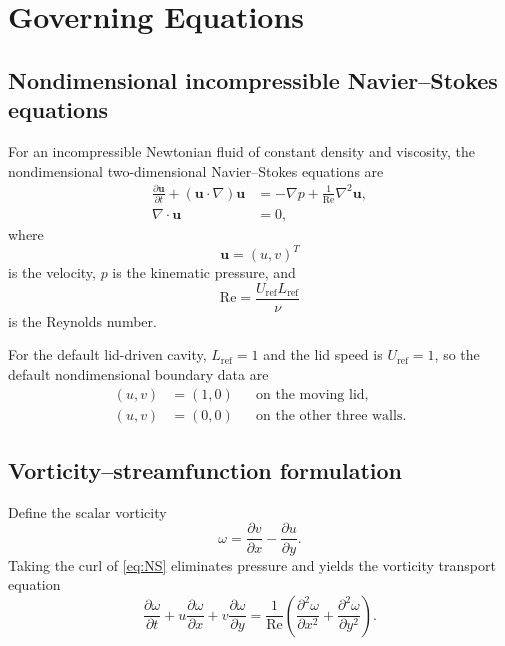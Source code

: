 \documentclass[11pt,a4paper]{article}
\newcommand{\Rey}{\mathrm{Re}}
\begin{document}
\section{Governing Equations}

\subsection{Nondimensional incompressible Navier--Stokes equations}

For an incompressible Newtonian fluid of constant density and viscosity, the nondimensional two-dimensional Navier--Stokes equations are
\begin{align}
\frac{\partial \bm{u}}{\partial t}
+ (\bm{u}\cdot\nabla)\bm{u}
&= -\nabla p + \frac{1}{\Rey}\nabla^2\bm{u},
\label{eq:NS}\\
\nabla\cdot\bm{u} &= 0,
\label{eq:continuity}
\end{align}
where
\[
\bm{u}=(u,v)^T
\]
is the velocity, $p$ is the kinematic pressure, and
\[
\Rey=\frac{U_{\mathrm{ref}}L_{\mathrm{ref}}}{\nu}
\]
is the Reynolds number.

For the default lid-driven cavity, $L_{\mathrm{ref}}=1$ and the lid speed is $U_{\mathrm{ref}}=1$, so the default nondimensional boundary data are
\begin{align*}
(u,v)&=(1,0) &&\text{on the moving lid},\\
(u,v)&=(0,0) &&\text{on the other three walls}.
\end{align*}

\subsection{Vorticity--streamfunction formulation}

Define the scalar vorticity
\begin{equation}
\omega = \frac{\partial v}{\partial x}-\frac{\partial u}{\partial y}.
\label{eq:vorticity-def}
\end{equation}
Taking the curl of \cref{eq:NS} eliminates pressure and yields the vorticity transport equation
\begin{equation}
\frac{\partial \omega}{\partial t}
+u\frac{\partial\omega}{\partial x}
+v\frac{\partial\omega}{\partial y}
=\frac{1}{\Rey}\left(
\frac{\partial^2\omega}{\partial x^2}
+\frac{\partial^2\omega}{\partial y^2}
\right).
\label{eq:vort-transport}
\end{equation}
\end{document}
